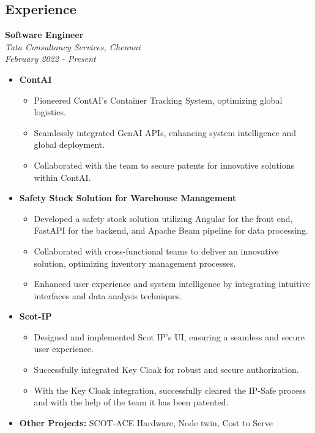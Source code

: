 \documentclass[letterpaper,10pt]{article}
\begin{document}
\begin{multicols}{2}

\section*{\textcolor{headercolor}{Experience}}

\textbf{Software Engineer} \\
\textit{Tata Consultancy Services, Chennai} \\
\textit{February 2022 - Present}
\begin{itemize}
    \item \textbf{ContAI}
    \begin{itemize}
        \item Pioneered ContAI's Container Tracking System, optimizing global logistics.
        \item Seamlessly integrated GenAI APIs, enhancing system intelligence and global deployment.
        \item Collaborated with the team to secure patents for innovative solutions within ContAI.
    \end{itemize}
    \item \textbf{Safety Stock Solution for Warehouse Management}
    \begin{itemize}
        \item Developed a safety stock solution utilizing Angular for the front end, FastAPI for the backend, and Apache Beam pipeline for data processing.
        \item Collaborated with cross-functional teams to deliver an innovative solution, optimizing inventory management processes.
        \item Enhanced user experience and system intelligence by integrating intuitive interfaces and data analysis techniques.
    \end{itemize}
    \item \textbf{Scot-IP}
    \begin{itemize}
        \item Designed and implemented Scot IP's UI, ensuring a seamless and secure user experience.
        \item Successfully integrated Key Cloak for robust and secure authorization.
        \item With the Key Cloak integration, successfully cleared the IP-Safe process and with the help of the team it has been patented.
    \end{itemize}
    \item \textbf{Other Projects:} SCOT-ACE Hardware, Node twin, Cost to Serve
\end{itemize}


\end{multicols}
\end{document}
